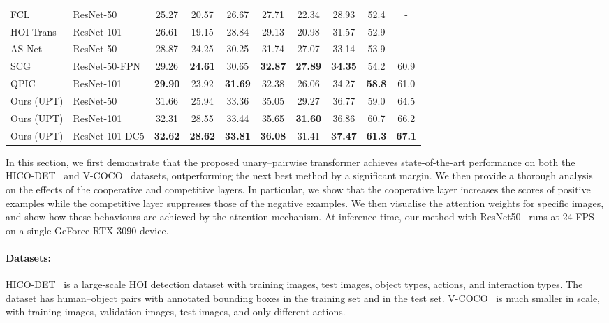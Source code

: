\documentclass[10pt,twocolumn,letterpaper]{article}
\begin{document}
\begin{table*}[t]
\begin{tabularx}{\linewidth}{@{\extracolsep{\fill}} l l cccccccc}
    FCL~\cite{fcl} & ResNet-50 & 25.27 & 20.57 & 26.67 & 27.71 & 22.34 & 28.93 & 52.4 & - \\
    HOI-Trans~\cite{hoitrans} & ResNet-101 & 26.61 & 19.15 & 28.84 & 29.13 & 20.98 & 31.57 & 52.9 & - \\
    AS-Net~\cite{asnet} & ResNet-50 & 28.87 & 24.25 & 30.25 & 31.74 & 27.07 & 33.14 & 53.9 & - \\
        SCG~\cite{scg} & ResNet-50-FPN & 29.26 & \textbf{24.61} & 30.65 & \textbf{32.87} & \textbf{27.89} & \textbf{34.35} & 54.2 & 60.9 \\
    QPIC~\cite{qpic} & ResNet-101 & \textbf{29.90} & 23.92 & \textbf{31.69} & 32.38 & 26.06 & 34.27 & \textbf{58.8} & 61.0 \\
    \midrule
    Ours (UPT) & ResNet-50 & 31.66 & 25.94 &  33.36 & 35.05 & 29.27 & 36.77 & 59.0 & 64.5 \\
    Ours (UPT) & ResNet-101 & 32.31 & 28.55 & 33.44 & 35.65 & \textbf{31.60} & 36.86 & 60.7 & 66.2 \\
    Ours (UPT) & ResNet-101-DC5 & \textbf{32.62} & \textbf{28.62} & \textbf{33.81} & \textbf{36.08} & 31.41 & \textbf{37.47} & \textbf{61.3} & \textbf{67.1} \\
        \bottomrule
    \end{tabularx}
\end{table*}

In this section, we first demonstrate that the proposed unary--pairwise transformer achieves state-of-the-art performance on both the HICO-DET~\cite{hicodet} and V-COCO~\cite{vcoco} datasets, outperforming the next best method by a significant margin. We then provide a thorough analysis on the effects of the cooperative and competitive layers. In particular, we show that the cooperative layer increases the scores of positive examples while the competitive layer suppresses those of the negative examples. We then visualise the attention weights for specific images, and show how these behaviours are achieved by the attention mechanism.
At inference time, our method with ResNet50~\cite{resnet} runs at 24 FPS on a single GeForce RTX 3090 device.

\paragraph{Datasets:}
HICO-DET~\cite{hicodet} is a large-scale HOI detection dataset with  training images,  test images,  object types,  actions, and  interaction types. The dataset has  human--object pairs with annotated bounding boxes in the training set and  in the test set.
V-COCO~\cite{vcoco} is much smaller in scale, with  training images,  validation images,  test images, and only  different actions.
\end{document}
